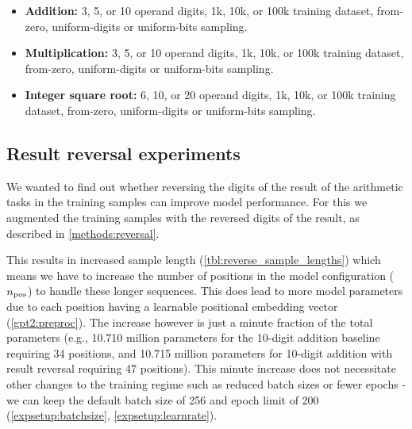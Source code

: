 \begin{itemize}
	\item \textbf{Addition:} 3, 5, or 10 operand digits, 1k, 10k, or 100k training dataset, from-zero, uniform-digits or uniform-bits sampling.
	\item \textbf{Multiplication:} 3, 5, or 10 operand digits, 1k, 10k, or 100k training dataset, from-zero, uniform-digits or uniform-bits sampling.
	\item \textbf{Integer square root:} 6, 10, or 20 operand digits, 1k, 10k, or 100k training dataset, from-zero, uniform-digits or uniform-bits sampling.
\end{itemize}



\subsection{Result reversal experiments}
\label{setup:reversal}

We wanted to find out whether reversing the digits of the result of the arithmetic tasks in the training samples can improve model performance. For this we augmented the training samples with the reversed digits of the result, as described in \cref{methods:reversal}.


This results in increased sample length (\cref{tbl:reverse_sample_lengths}) which means we have to increase the number of positions in the model configuration (${n_\textrm{pos}}$) to handle these longer sequences. This does lead to more model parameters due to each position having a learnable positional embedding vector (\cref{gpt2:preproc}). The increase however is just a minute fraction of the total parameters (e.g., 10.710 million parameters for the 10-digit addition baseline requiring 34 positions, and 10.715 million parameters for 10-digit addition with result reversal requiring 47 positions). This minute increase does not necessitate other changes to the training regime such as reduced batch sizes or fewer epochs - we can keep the default batch size of 256 and epoch limit of 200 (\cref{expsetup:batchsize}, \cref{expsetup:learnrate}).


